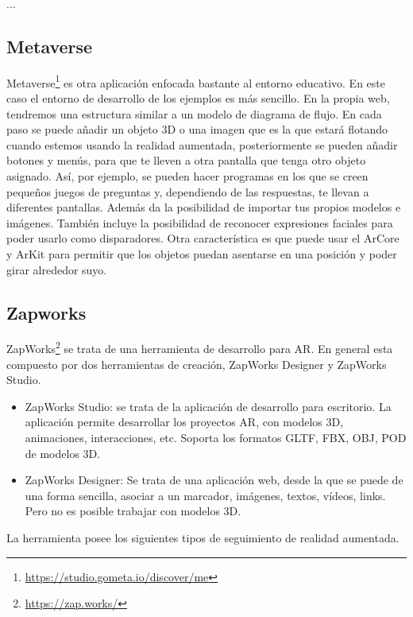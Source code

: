 ...

\subsection{Metaverse} 

Metaverse\footnote{\url{https://studio.gometa.io/discover/me}} es otra aplicación enfocada bastante al entorno educativo. En este caso el entorno de desarrollo de los ejemplos es más sencillo. En la propia web, tendremos una estructura similar a un modelo de diagrama de flujo. En cada paso se puede añadir un objeto 3D o una imagen que es la que estará flotando cuando estemos usando la realidad aumentada, posteriormente se pueden añadir botones y menús, para que te lleven a otra pantalla que tenga otro objeto asignado. Así, por ejemplo, se pueden hacer programas en los que se creen pequeños juegos de preguntas y, dependiendo de las respuestas, te llevan a diferentes pantallas.
Además da la posibilidad de importar tus propios modelos e imágenes.
También incluye la posibilidad de reconocer expresiones faciales para poder usarlo como disparadores.
Otra característica es que puede usar el ArCore y ArKit para permitir que los objetos puedan asentarse en una posición y poder girar alrededor suyo.

\subsection{Zapworks} ZapWorks\footnote{\url{https://zap.works/}} se trata de una herramienta de desarrollo para AR. En general esta compuesto por dos herramientas de creación, ZapWorks Designer y ZapWorks Studio.

\begin{itemize}
	\item ZapWorks Studio: se trata de la aplicación de desarrollo para escritorio. La aplicación permite desarrollar los proyectos AR, con modelos 3D, animaciones, interacciones, etc. Soporta los formatos  GLTF, FBX, OBJ, POD de modelos 3D.
	\item ZapWorks Designer: Se trata de una aplicación web, desde la que se puede de una forma sencilla, asociar a un marcador, imágenes, textos, vídeos, links. Pero no es posible trabajar con modelos 3D.
\end{itemize}	

La herramienta posee los siguientes tipos de seguimiento de realidad aumentada.

